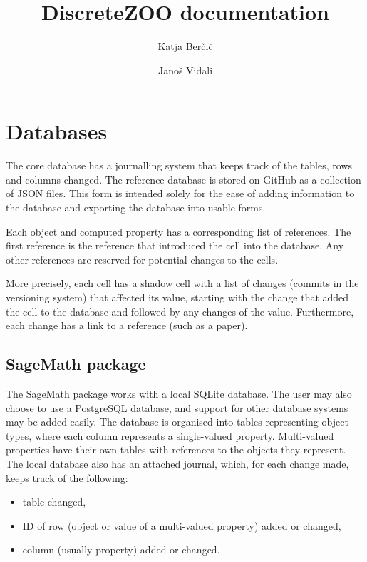 \documentclass[12pt,a4paper]{article}
\begin{document}
\title{DiscreteZOO documentation}
\author{Katja Ber\v{c}i\v{c} \and  Jano\v{s} Vidali}
\maketitle

\section{Databases}

The core database has a journalling system
that keeps track of the tables, rows and columns changed.
The reference database is stored on GitHub as a collection of JSON files.
This form is intended solely
for the ease of adding information to the database
and exporting the database into usable forms.

Each object and computed property has a corresponding list of references.
The first reference is the reference
that introduced the cell into the database.
Any other references are reserved for potential changes to the cells.

More precisely, each cell has a shadow cell with a list of changes
(commits in the versioning system)
that affected its value,
starting with the change that added the cell to the database
and followed by any changes of the value.
Furthermore, each change has a link to a reference (such as a paper).

\subsection{SageMath package}

The SageMath package works with a local SQLite database.
The user may also choose to use a PostgreSQL database,
and support for other database systems may be added easily.
The database is organised into tables representing object types,
where each column represents a single-valued property.
Multi-valued properties have their own tables
with references to the objects they represent.
The local database also has an attached journal,
which, for each change made, keeps track of the following:
\begin{itemize}
\item table changed,
\item ID of row (object or value of a multi-valued property) added or changed,
\item column (usually property) added or changed.
\end{itemize}
\end{document}
